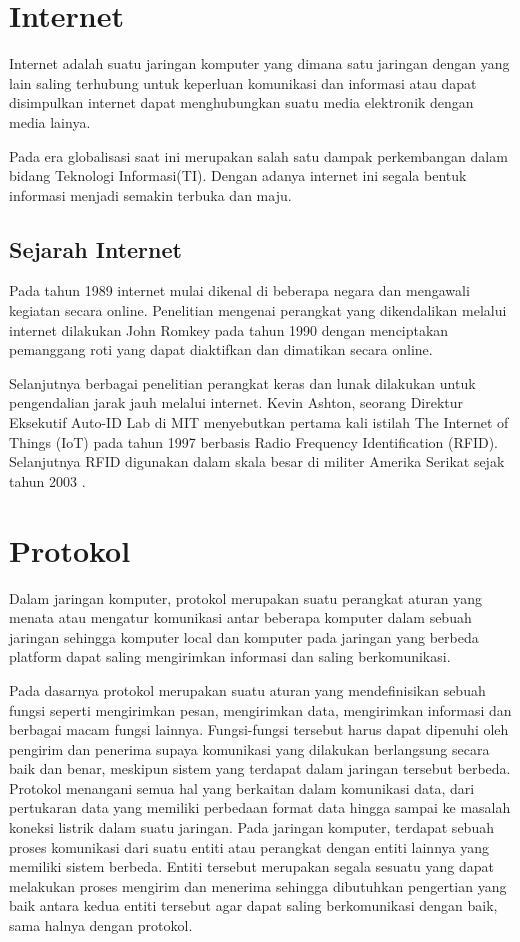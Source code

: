 \section{Internet}
Internet adalah suatu jaringan komputer yang dimana satu jaringan dengan yang lain saling terhubung untuk keperluan komunikasi dan informasi atau dapat disimpulkan internet dapat menghubungkan suatu media elektronik dengan media lainya.

Pada era globalisasi saat ini merupakan salah satu dampak perkembangan dalam bidang Teknologi Informasi(TI). Dengan adanya internet ini segala bentuk informasi menjadi semakin terbuka dan maju.

\subsection{Sejarah Internet}
Pada tahun 1989 internet mulai dikenal di beberapa negara dan mengawali kegiatan secara online.
Penelitian mengenai perangkat yang dikendalikan melalui internet dilakukan John Romkey pada tahun 1990 
dengan menciptakan  pemanggang roti yang dapat diaktifkan dan dimatikan secara online.

Selanjutnya berbagai penelitian  perangkat  keras  dan  lunak dilakukan untuk pengendalian jarak jauh melalui internet.
Kevin Ashton, seorang Direktur Eksekutif Auto-ID Lab di MIT menyebutkan pertama kali istilah The Internet of Things (IoT)
pada tahun 1997 berbasis Radio Frequency  Identification (RFID). Selanjutnya  RFID digunakan dalam skala besar di militer
Amerika Serikat sejak tahun 2003 \cite{wilianto2018sejarah}.

\section{Protokol}
Dalam jaringan komputer, protokol merupakan suatu perangkat aturan yang menata atau mengatur komunikasi antar beberapa komputer dalam sebuah jaringan sehingga komputer local dan komputer pada jaringan yang berbeda platform dapat saling mengirimkan informasi dan saling berkomunikasi.   

Pada dasarnya protokol merupakan suatu aturan yang mendefinisikan sebuah fungsi seperti mengirimkan pesan, mengirimkan data, mengirimkan informasi dan berbagai macam fungsi lainnya. Fungsi-fungsi tersebut harus dapat dipenuhi oleh pengirim dan penerima supaya komunikasi yang dilakukan berlangsung secara baik dan benar, meskipun sistem yang terdapat dalam jaringan tersebut berbeda. Protokol menangani semua hal yang berkaitan dalam komunikasi data, dari pertukaran data yang memiliki perbedaan format data hingga sampai ke masalah koneksi listrik dalam suatu jaringan. Pada jaringan komputer, terdapat sebuah proses komunikasi dari suatu entiti atau perangkat dengan entiti lainnya yang memiliki sistem berbeda. Entiti tersebut merupakan segala sesuatu yang dapat melakukan proses mengirim dan menerima sehingga dibutuhkan pengertian yang baik antara kedua entiti tersebut agar dapat saling berkomunikasi dengan baik, sama halnya dengan protokol.

